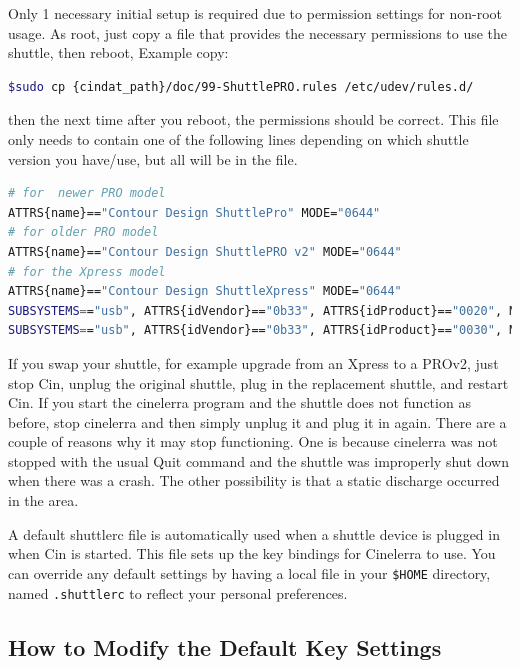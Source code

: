 \vspace{1ex}
\noindent Only 1 necessary initial setup is required due to permission settings for non-root usage. As root, just copy a file that provides the necessary permissions to use the shuttle, then reboot,  Example copy:

\begin{lstlisting}[language=Bash]
$sudo cp {cindat_path}/doc/99-ShuttlePRO.rules /etc/udev/rules.d/
\end{lstlisting}

\noindent then the next time after you reboot, the permissions should be correct. This file only needs to contain one of the following lines depending on which shuttle version you have/use, but all will be in the file.
\begin{lstlisting}[language=Bash,basicstyle=\footnotesize]
# for  newer PRO model 
ATTRS{name}=="Contour Design ShuttlePro" MODE="0644"		
# for older PRO model 
ATTRS{name}=="Contour Design ShuttlePRO v2" MODE="0644"	
# for the Xpress model 
ATTRS{name}=="Contour Design ShuttleXpress" MODE="0644"	
SUBSYSTEMS=="usb", ATTRS{idVendor}=="0b33", ATTRS{idProduct}=="0020", MODE="0666" 
SUBSYSTEMS=="usb", ATTRS{idVendor}=="0b33", ATTRS{idProduct}=="0030", MODE="0666"
\end{lstlisting}
If you swap your shuttle, for example upgrade from an Xpress to a PROv2, just stop Cin, unplug the original shuttle, plug in the replacement shuttle, and restart Cin.  If you start the cinelerra program and the shuttle does not function as before, stop cinelerra and then simply unplug it and plug it in again.  There are a couple of reasons why it may stop functioning.  One is because cinelerra was not stopped with the usual Quit command and the shuttle was improperly shut down when there was a crash.  The other possibility is that a static discharge occurred in the area.

A default shuttlerc file is automatically used when a shuttle device is plugged in when Cin is started. This file sets up the key bindings for Cinelerra to use. You can override any default settings by having a local file in your \texttt{\$HOME} directory, named \texttt{.shuttlerc} to reflect your personal preferences.

\subsection{How to Modify the Default Key Settings}%
\label{sub:modify_default_key_settings}

